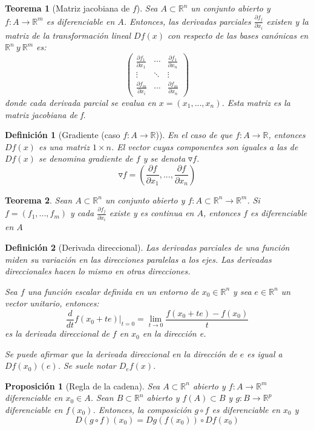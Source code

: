 \documentclass[11pt, a4paper]{article}
\newcommand{\R}{\mathbb{R}}
\theoremstyle{theorem-style}
\newtheorem*{nth}{Teorema}
\newtheorem*{nprop}{Proposición}
\theoremstyle{definition-style}
\newtheorem*{ndef}{Definición}
\theoremstyle{remark-style}
\theoremstyle{example-style}
\begin{document}
\begin{nth}[Matriz jacobiana de $f$]
Sea $A\subset \R^n$ un conjunto abierto y $f:A \to \R^m$ es diferenciable en $A$. Entonces, las derivadas parciales $\frac{\partial f_j}{\partial x_i}$ existen y la matriz de la transformación lineal $Df(x)$ con respecto de las bases canónicas en $\R^n \ y \ \R^m$ es:
\[
\begin{pmatrix}
 \frac{\partial f_1}{\partial x_1} & \cdots & \frac{\partial f_1}{\partial x_n} \\
 \vdots & \ddots&\vdots \\
 \frac{\partial f_m}{\partial x_i} & \cdots & \frac{\partial f_m}{\partial x_n}
\end{pmatrix} 
\]
donde cada derivada parcial se evalua en $x=(x_1,...,x_n)$. Esta matriz es la matriz jacobiana de f.
	
\end{nth}
\begin{ndef}[Gradiente (caso $f:A \to \mathbb{R}$)]
	En el caso de que $f:A \to \R$, entonces $Df(x)$ es una matriz $1\times n$. El vector cuyas componentes son iguales a las de $Df(x)$ se denomina gradiente de $f$ y se denota $\triangledown f$.
	\[
	\triangledown f = (\frac{\partial f}{\partial x_1},..., \frac{\partial f}{\partial x_n})
	\]
\end{ndef}

\begin{nth}
	Sean $A \subset \R^n$ un conjunto abierto y $f:A \subset \R^n \to \R^m$. Si $f=(f_1,...,f_m)$ y cada $\frac{\partial f_j}{\partial x_i}$ existe y es continua en $A$, entonces $f$ es diferenciable en $A$
\end{nth}

\begin{ndef}[Derivada direccional]
	Las derivadas parciales de una función miden su variación en las direcciones paralelas a los ejes. Las derivadas direccionales hacen lo mismo en otras direcciones.
	
	Sea $f$ una función escalar definida en un entorno de $x_0\in \R^n$ y sea $e\in \R^n$ un vector unitario, entonces:
	\[
	\frac{d}{dt}f(x_0+te)|_{t= 0} =  \lim_{t\to 0} \frac{f(x_0+te) -f(x_0)}{t}
	\]
	es la derivada direccional de $f$ en $x_0$ en la dirección e.
	
	Se puede afirmar que la derivada direccional en la dirección de $e$ es igual a $Df(x_0)(e)$. Se suele notar $D_ef(x)$.
\end{ndef}
\begin{nprop}[Regla de la cadena]
	Sea $A\subset \R^n$ abierto y $f:A \to \R^m$ diferenciable en $x_0 \in A$. Sean $B\subset \R^n$ abierto y $f(A) \subset B$ y $g:B \to \R^p$ diferenciable en $f(x_0)$. Entonces, la composición $g\circ f$ es diferenciable en $x_0$ y 
	\[
	D(g \circ f)(x_0) = Dg(f(x_0)) \circ Df(x_0)
	\]
\end{nprop} 
\end{document}

